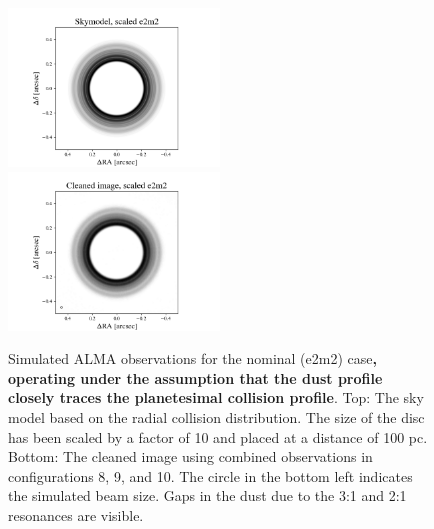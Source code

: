 \documentclass[fleqn,usenatbib]{mnras}
\begin{document}
\begin{figure}
\begin{center}
    \includegraphics[width=0.5\textwidth]{alma/skymodel_e2m2.png}
    \includegraphics[width=0.5\textwidth]{alma/xy_e2m2.png}
    \caption{Simulated ALMA observations for the nominal (e2m2) case\textbf{, operating under the assumption that the dust profile closely traces the planetesimal collision profile}.  Top: 
    The sky model based on the radial collision distribution. The size of the disc has been scaled by a factor of 10 and placed at  a distance of 100 pc. Bottom: The cleaned image using 
    combined observations in configurations 8, 9, and 10. The circle in the bottom left indicates the simulated beam size. Gaps in the dust due to the 3:1 and 2:1 resonances are visible. 
    \label{fig:alma_sim_obs}}
\end{center}
\end{figure}
\end{document}
